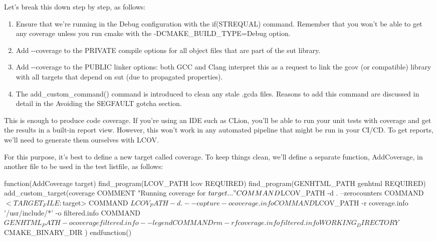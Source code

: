 
Let’s break this down step by step, as follows:

\begin{enumerate}
\item
Ensure that we’re running in the Debug configuration with the if(STREQUAL) command. Remember that you won’t be able to get any coverage unless you run cmake with the -DCMAKE\_BUILD\_TYPE=Debug option.

\item
Add -{}-coverage to the PRIVATE compile options for all object files that are part of the sut library.

\item
Add -{}-coverage to the PUBLIC linker options: both GCC and Clang interpret this as a request to link the gcov (or compatible) library with all targets that depend on sut (due to propagated properties).

\item
The add\_custom\_command() command is introduced to clean any stale .gcda files. Reasons to add this command are discussed in detail in the Avoiding the SEGFAULT gotcha section.
\end{enumerate}

This is enough to produce code coverage. If you’re using an IDE such as CLion, you’ll be able to run your unit tests with coverage and get the results in a built-in report view. However, this won’t work in any automated pipeline that might be run in your CI/CD. To get reports, we’ll need to generate them ourselves with LCOV.

For this purpose, it’s best to define a new target called coverage. To keep things clean, we’ll define a separate function, AddCoverage, in another file to be used in the test listfile, as follows:


\begin{cmake}
function(AddCoverage target)
    find_program(LCOV_PATH lcov REQUIRED)
    find_program(GENHTML_PATH genhtml REQUIRED)
    add_custom_target(coverage
        COMMENT "Running coverage for ${target}..."
        COMMAND ${LCOV_PATH} -d . --zerocounters
        COMMAND $<TARGET_FILE:${target}>
        COMMAND ${LCOV_PATH} -d . --capture -o coverage.info
        COMMAND ${LCOV_PATH} -r coverage.info '/usr/include/*'
                             -o filtered.info
        COMMAND ${GENHTML_PATH} -o coverage filtered.info
            --legend
        COMMAND rm -rf coverage.info filtered.info
        WORKING_DIRECTORY ${CMAKE_BINARY_DIR}
    )
endfunction()
\end{cmake}

